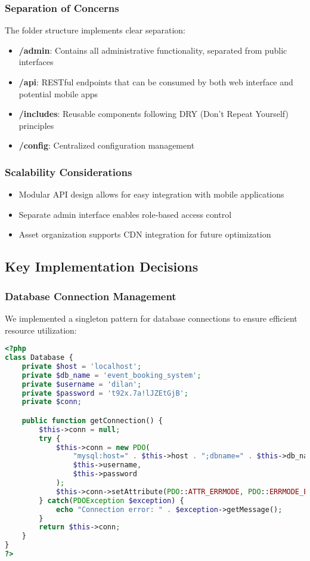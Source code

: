 \documentclass[12pt,a4paper]{article}
\begin{document}
\subsubsection{Separation of Concerns}
The folder structure implements clear separation:
\begin{itemize}
    \item \textbf{/admin}: Contains all administrative functionality, separated from public interfaces
    \item \textbf{/api}: RESTful endpoints that can be consumed by both web interface and potential mobile apps
    \item \textbf{/includes}: Reusable components following DRY (Don't Repeat Yourself) principles
    \item \textbf{/config}: Centralized configuration management
\end{itemize}

\subsubsection{Scalability Considerations}
\begin{itemize}
    \item Modular API design allows for easy integration with mobile applications
    \item Separate admin interface enables role-based access control
    \item Asset organization supports CDN integration for future optimization
\end{itemize}

\subsection{Key Implementation Decisions}

\subsubsection{Database Connection Management}
We implemented a singleton pattern for database connections to ensure efficient resource utilization:

\begin{lstlisting}[language=php, caption=Database Connection Class]
<?php
class Database {
    private $host = 'localhost';
    private $db_name = 'event_booking_system';
    private $username = 'dilan';
    private $password = 't92x.7a!lJZEtGjB';
    private $conn;

    public function getConnection() {
        $this->conn = null;
        try {
            $this->conn = new PDO(
                "mysql:host=" . $this->host . ";dbname=" . $this->db_name,
                $this->username,
                $this->password
            );
            $this->conn->setAttribute(PDO::ATTR_ERRMODE, PDO::ERRMODE_EXCEPTION);
        } catch(PDOException $exception) {
            echo "Connection error: " . $exception->getMessage();
        }
        return $this->conn;
    }
}
?>
\end{lstlisting}
\end{document}
